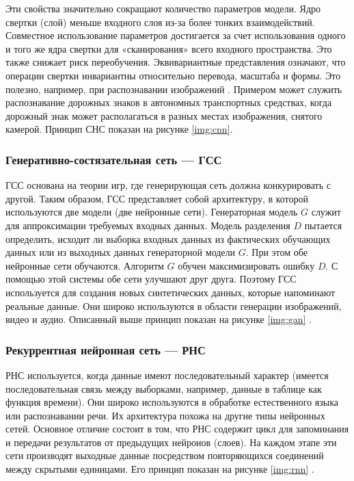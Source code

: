 Эти свойства значительно сокращают количество параметров модели. Ядро свертки (слой) меньше входного слоя из-за более тонких взаимодействий. Совместное использование параметров достигается за счет использования одного и того же ядра свертки для «сканирования» всего входного пространства. Это также снижает риск переобучения. Эквивариантные представления означают, что операции свертки инвариантны относительно перевода, масштаба и формы. Это полезно, например, при распознавании изображений \cite{introdmachlearn}. Примером может служить распознавание дорожных знаков в автономных транспортных средствах, когда дорожный знак может располагаться в разных местах изображения, снятого камерой. Принцип СНС показан на рисунке \ref{img:cnn}.


\FloatBarrier

\subsubsection*{Генеративно-состязательная сеть --- ГСС}

ГСС основана на теории игр, где генерирующая сеть должна конкурировать с другой. Таким образом, ГСС представляет собой архитектуру, в которой используются две модели (две нейронные сети). Генераторная модель $G$ служит для аппроксимации требуемых входных данных. Модель разделения $D$ пытается определить, исходит ли выборка входных данных из фактических обучающих данных или из выходных данных генераторной модели $G$. При этом обе нейронные сети обучаются. Алгоритм $G$ обучен максимизировать ошибку $D$. С помощью этой системы обе сети улучшают друг друга. Поэтому ГСС используется для создания новых синтетических данных, которые напоминают реальные данные. Они широко используются в области генерации изображений, видео и аудио. Описанный выше принцип показан на рисунке \ref{img:gan} \cite{deeplearninmob}.


\FloatBarrier

\subsubsection*{Рекуррентная нейронная сеть --- РНС}

РНС используется, когда данные имеют последовательный характер (имеется последовательная связь между выборками, например, данные в таблице как функция времени). Они широко используются в обработке естественного языка или распознавании речи. Их архитектура похожа на другие типы нейронных сетей. Основное отличие состоит в том, что РНС содержит цикл для запоминания и передачи результатов от предыдущих нейронов (слоев). На каждом этапе эти сети производят выходные данные посредством повторяющихся соединений между скрытыми единицами. Его принцип показан на рисунке \ref{img:rnn} \cite{deeplearninmob}.

